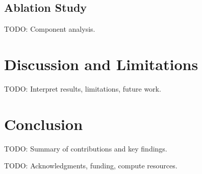 \documentclass[sigconf,review,anonymous]{acmart}
\begin{document}
\subsection{Ablation Study}
TODO: Component analysis.

\section{Discussion and Limitations}
\label{sec:discussion}
TODO: Interpret results, limitations, future work.

\section{Conclusion}
\label{sec:conclusion}
TODO: Summary of contributions and key findings.

\begin{acks}
TODO: Acknowledgments, funding, compute resources.
\end{acks}



\end{document}
